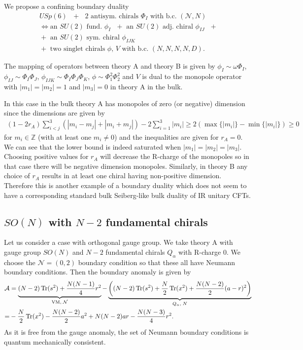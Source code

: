 \documentclass[12pt]{article}
\newcommand{\Zb}{\mathbb{Z}}
\newcommand{\Acal}{\mathcal{A}}
\newcommand{\Ncal}{\mathcal{N}}
\DeclareMathOperator*{\Tr}{{\rm Tr}}
\numberwithin{equation}{section}
\begin{document}
We propose a confining boundary duality 
\begin{align}
\label{bcdual_USp6_2AS_dual}
&\textrm{$USp(6)$ $+$ $2$ antisym. chirals $\Phi_{I}$ with b.c. $(\mathcal{N},N)$}
\nonumber\\
&\Leftrightarrow 
\textrm{
an $SU(2)$ fund. $\phi_I$ $+$ 
an $SU(2)$ adj. chiral $\phi_{IJ}$ $+$ 
}
\nonumber\\
&\textrm{
$+$ an $SU(2)$ sym. chiral $\phi_{IJK}$
}
\nonumber\\
&
\textrm{
$+$ two singlet chirals $\phi$, $V$ with b.c. $(N,N,N,N,D)$
}. 
\end{align}

The mapping of operators between theory A and theory B is given by
$\phi_I \sim \omega \Phi_I$, $\phi_{IJ} \sim \Phi_I \Phi_J$, $\phi_{IJK} \sim \Phi_I \Phi_J \Phi_K$, $\phi \sim \Phi_1^2 \Phi_2^2$ and $V$ is dual to the monopole operator with $|m_1| = |m_2| = 1$ and $|m_3| = 0$ in theory A in the bulk. 

In this case in the bulk theory A has monopoles of zero (or negative) dimension since the dimensions are given by
\begin{align}
\label{Mono_Ch_usp6_0_2}
    (1 - 2r_A)\sum_{i < j}^3 \left( |m_i - m_j| + |m_i + m_j| \right) - 2 \sum_{i = 1}^3 |m_i| \ge 2\left( \max \{ |m_i| \} - \min \{ |m_i| \} \right) \ge 0
\end{align}
for $m_i \in \Zb$ (with at least one $m_i \ne 0$) and the inequalities are given for $r_A = 0$. We can see that the lower bound is indeed saturated when $|m_1| = |m_2| = |m_3|$. Choosing positive values for $r_A$ will decrease the R-charge of the monopoles so in that case there will be negative dimension monopoles. Similarly, in theory B any choice of $r_A$ results in at least one chiral having non-positive dimension. 
Therefore this is another example of a boundary duality which does not seem to have a corresponding standard bulk Seiberg-like bulk duality of IR unitary CFTs.


\subsection{$SO(N)$ with $N-2$ fundamental chirals}
\label{sec_GAW_SO_integrals}
Let us consider a case with orthogonal gauge group. 
We take theory A with gauge group $SO(N)$ and $N - 2$ fundamental chirals $Q_{\alpha}$
with R-charge $0$. We choose the $\mathcal{N}=(0,2)$ boundary condition 
so that these all have Neumann boundary conditions.
Then the boundary anomaly is given by
\begin{align}
\label{bdy_SON_Nm2_anomA}
\Acal & = \underbrace{(N-2)\Tr(s^2) + \frac{N(N-1)}{4}r^2}_{\textrm{VM}, \; \Ncal}
 - \underbrace{\left( (N-2)\Tr(s^2) + \frac{N}{2}\Tr(x^2) + \frac{N(N-2)}{2}(a-r)^2 \right)}_{Q_{\alpha}, \; N}
    \nonumber \\
  = & - \frac{N}{2} \Tr(x^2) - \frac{N(N-2)}{2}a^2 + N(N-2)ar - \frac{N(N-3)}{4}r^2. 
\end{align}
As it is free from the gauge anomaly, 
the set of Neumann boundary conditions is quantum mechanically consistent. 
\end{document}
